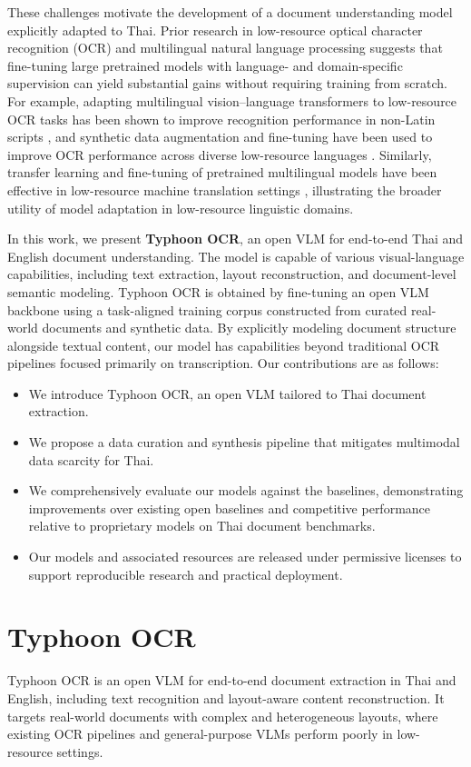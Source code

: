 \documentclass[]{typhoon} %
\begin{document}
These challenges motivate the development of a document understanding model explicitly adapted to Thai. Prior research in low-resource optical character recognition (OCR) and multilingual natural language processing suggests that fine-tuning large pretrained models with language- and domain-specific supervision can yield substantial gains without requiring training from scratch. For example, adapting multilingual vision–language transformers to low-resource OCR tasks has been shown to improve recognition performance in non-Latin scripts \citep{cheema2024adapting}, and synthetic data augmentation and fine-tuning have been used to improve OCR performance across diverse low-resource languages \citep{ignat-etal-2022-ocr}. Similarly, transfer learning and fine-tuning of pretrained multilingual models have been effective in low-resource machine translation settings \citep{dalal-etal-2024-ai}, illustrating the broader utility of model adaptation in low-resource linguistic domains.

In this work, we present \textbf{Typhoon OCR}, an open VLM for end-to-end Thai and English document understanding. The model is capable of various visual-language capabilities, including text extraction, layout reconstruction, and document-level semantic modeling. Typhoon OCR is obtained by fine-tuning an open VLM backbone using a task-aligned training corpus constructed from curated real-world documents and synthetic data. By explicitly modeling document structure alongside textual content, our model has capabilities beyond traditional OCR pipelines focused primarily on transcription. Our contributions are as follows:
\begin{itemize}[leftmargin=*]
\setlength\itemsep{-0.1em}
    \item We introduce Typhoon OCR, an open VLM tailored to Thai document extraction.
    \item We propose a data curation and synthesis pipeline that mitigates multimodal data scarcity for Thai.
    \item We comprehensively evaluate our models against the baselines, demonstrating improvements over existing open baselines and competitive performance relative to proprietary models on Thai document benchmarks.
    \item Our models and associated resources are released under permissive licenses to support reproducible research and practical deployment.
\end{itemize}


\section{Typhoon OCR}
%
Typhoon OCR is an open VLM for end-to-end document extraction in Thai and English, including text recognition and layout-aware content reconstruction. It targets real-world documents with complex and heterogeneous layouts, where existing OCR pipelines and general-purpose VLMs perform poorly in low-resource settings.
\end{document}
